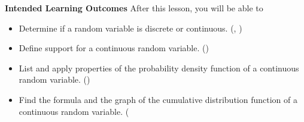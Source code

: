 \documentclass[10pt]{article}
\begin{document}
\thispagestyle{firstpage}
\pagestyle{otherpages}


\textbf{Intended Learning Outcomes}
After this lesson, you will be able to 

\begin{itemize}
\item Determine if a random variable is discrete or continuous. (, )
\item Define support for a continuous random variable. ()
\item List and apply properties of the probability density function of a continuous random variable. ()
\item Find the formula and the graph of the cumulative distribution function of a continuous random variable. (
\end{itemize}

\vspace{-0.5cm}

\hrulefill
\end{document}
